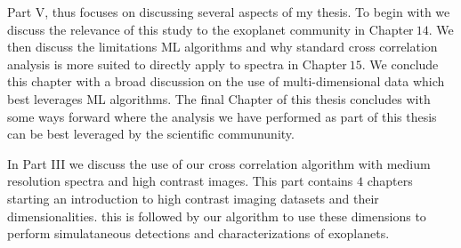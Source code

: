 Part V, thus focuses on discussing several aspects of my thesis. 
To begin with we discuss the relevance of this study to the exoplanet community in Chapter$~14$.
We then discuss the limitations ML algorithms and why standard cross correlation analysis is more suited to directly apply to spectra in Chapter$~15$.
We conclude this chapter with a broad discussion on the use of multi-dimensional data which best leverages ML algorithms.
The final Chapter of this thesis concludes with some ways forward where the analysis we have performed as part of this thesis can be best leveraged by the scientific commununity.  


In Part III we discuss the use of our cross correlation algorithm with medium resolution spectra and high contrast images.
This part contains $4$ chapters starting an introduction to high contrast imaging datasets and their dimensionalities.
this is followed by our algorithm to use these dimensions to perform simulataneous detections and characterizations of exoplanets.

